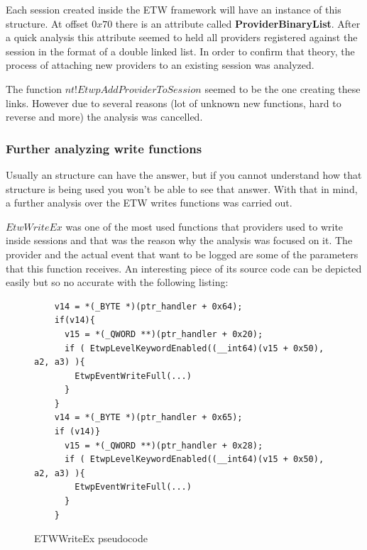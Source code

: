 Each session created inside the ETW framework will have an instance of this structure. At offset $0x70$ there is an attribute called {\bfseries ProviderBinaryList}. After a quick analysis this attribute seemed to held all providers registered against the session in the format of a double linked list. In order to confirm that theory, the process of attaching new providers to an existing session was analyzed. 

The function $nt!EtwpAddProviderToSession$ seemed to be the one creating these links. However due to several reasons (lot of unknown new functions, hard to reverse and more) the analysis was cancelled. %


\subsubsection{\bfseries Further  analyzing write functions}

Usually an structure can have the answer, but if you cannot understand how that structure is being used you won't be able to see that answer. With that in mind, a further analysis over the ETW writes functions was carried out.

$EtwWriteEx$ was one of the most used functions that providers used to write inside sessions and that was the reason why the analysis was focused on it. The provider and the actual event that want to be logged are some of the parameters that this function receives. An interesting piece of its source code can be depicted easily but so no accurate with the following listing: 

\begin{figure}[H]
  \begin{lstlisting}
    v14 = *(_BYTE *)(ptr_handler + 0x64);
    if(v14){
      v15 = *(_QWORD **)(ptr_handler + 0x20);
      if ( EtwpLevelKeywordEnabled((__int64)(v15 + 0x50), a2, a3) ){
        EtwpEventWriteFull(...)
      }
    }
    v14 = *(_BYTE *)(ptr_handler + 0x65); 
    if (v14)}
      v15 = *(_QWORD **)(ptr_handler + 0x28);
      if ( EtwpLevelKeywordEnabled((__int64)(v15 + 0x50), a2, a3) ){
        EtwpEventWriteFull(...)
      }
    }
  \end{lstlisting} 
  \caption[]{ETWWriteEx pseudocode }
  \label{fig:etw_write_ex_pseudocode}
\end{figure}

